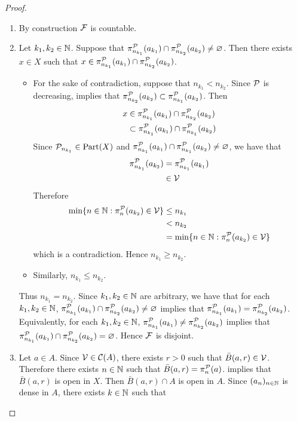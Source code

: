\documentclass{book}
\begin{document}
\begin{proof}
\begin{itemize}
\begin{enumerate}
				\item By construction $\mathcal{F}$ is countable.
				\item Let $k_1, k_2 \in \mathbb{N}$. Suppose that $\pi^{\mathcal{P}}_{n_{k_1}}(a_{k_1}) \cap \pi^{\mathcal{P}}_{n_{k_2}}(a_{k_2}) \neq \varnothing$. Then there exists $x \in X$ such that $x \in \pi^{\mathcal{P}}_{n_{k_1}}(a_{k_1}) \cap \pi^{\mathcal{P}}_{n_{k_2}}(a_{k_2})$. 
				\begin{itemize}
					\item For the sake of contradiction, suppose that $n_{k_1} < n_{k_2}$. Since $\mathcal{P}$ is decreasing,  implies that $\pi^{\mathcal{P}}_{n_{k_2}}(a_{k_2}) \subset \pi^{\mathcal{P}}_{n_{k_1}}(a_{k_2})$. Then
					\begin{align*}
						x
						& \in \pi^{\mathcal{P}}_{n_{k_1}}(a_{k_1}) \cap \pi^{\mathcal{P}}_{n_{k_2}}(a_{k_2}) \\
						& \subset \pi^{\mathcal{P}}_{n_{k_1}}(a_{k_1}) \cap \pi^{\mathcal{P}}_{n_{k_1}}(a_{k_2}) 
					\end{align*}
					Since $\mathcal{P}_{n_{k_1}} \in \operatorname*{\text{Part}}(X)$ and $\pi^{\mathcal{P}}_{n_{k_1}}(a_{k_1}) \cap \pi^{\mathcal{P}}_{n_{k_1}}(a_{k_2}) \neq \varnothing$, we have that 
					\begin{align*}
						\pi^{\mathcal{P}}_{n_{k_1}}(a_{k_2})
						& = \pi^{\mathcal{P}}_{n_{k_1}}(a_{k_1}) \\
						& \in \mathcal{V}
					\end{align*}
					Therefore
					\begin{align*}
						\min \{n \in \mathbb{N}: \pi^{\mathcal{P}}_n(a_{k_2}) \in \mathcal{V}\}
						& \leq n_{k_1} \\
						& < n_{k_2} \\
						& = \min \{n \in \mathbb{N}: \pi^{\mathcal{P}}_n(a_{k_2}) \in \mathcal{V}\}
					\end{align*}
					which is a contradiction. Hence $n_{k_1} \geq n_{k_2}$. 
					\item Similarly, $n_{k_1} \leq n_{k_2}$.
				\end{itemize}
				Thus $n_{k_1} = n_{k_2}$. Since $k_1, k_2 \in \mathbb{N}$ are arbitrary, we have that for each $k_1, k_2 \in \mathbb{N}$, $\pi^{\mathcal{P}}_{n_{k_1}}(a_{k_1}) \cap \pi^{\mathcal{P}}_{n_{k_2}}(a_{k_2}) \neq \varnothing$ implies that $\pi^{\mathcal{P}}_{n_{k_1}}(a_{k_1}) = \pi^{\mathcal{P}}_{n_{k_2}}(a_{k_2})$. Equivalently, for each $k_1, k_2 \in \mathbb{N}$, $\pi^{\mathcal{P}}_{n_{k_1}}(a_{k_1}) \neq \pi^{\mathcal{P}}_{n_{k_2}}(a_{k_2})$ implies that $\pi^{\mathcal{P}}_{n_{k_1}}(a_{k_1}) \cap \pi^{\mathcal{P}}_{n_{k_2}}(a_{k_2}) = \varnothing$. Hence $\mathcal{F}$ is disjoint.
				\item Let $a \in A$. Since $\mathcal{V} \in \mathcal{C}(A)$, there exists $r > 0$ such that $\bar{B}(a, r) \in \mathcal{V}$. Therefore there exists $n \in \mathbb{N}$ such that $\bar{B}(a, r) = \pi^{\mathcal{P}}_n(a)$.  implies that $\bar{B}(a, r)$ is open in $X$. Then $\bar{B}(a, r) \cap A$ is open in $A$. Since $(a_n)_{n \in \mathbb{N}}$ is dense in $A$, there exists $k \in \mathbb{N}$ such that 

\end{enumerate}
\end{itemize}
\end{proof}
\end{document}
